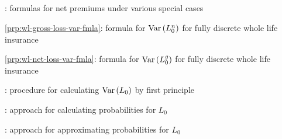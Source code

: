\subsection*{}
\item {}: formulas for net premiums under various special cases
\item \cref{prp:wl-gross-loss-var-fmla}: formula for \(\operatorname{Var}\qty(L_0^n)\) for fully discrete whole life insurance
\item \cref{prp:wl-net-loss-var-fmla}: formula for \(\operatorname{Var}\qty(L_0^g)\) for fully discrete whole life insurance
\item {}: procedure for calculating \(\operatorname{Var}\qty(L_0)\) by first principle
\item {}: approach for calculating probabilities for \(L_0\)
\item {}: approach for approximating probabilities for \(L_0\)
